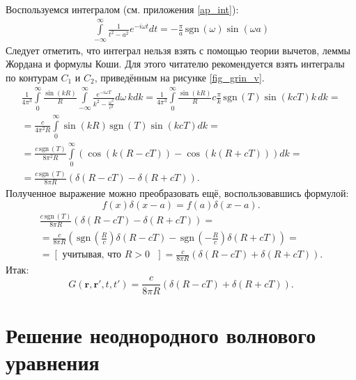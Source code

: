\documentclass[a4paper,14pt]{extreport} %
\renewcommand{\vec}[1]{\boldsymbol{#1}}
\newcommand{\sign}{\mathrm{\,sgn}\,}
\begin{document}
	Воспользуемся интегралом (см. приложения \ref{ap_int}):
	\begin{gather*}
	\int\limits_{-\infty}^\infty \frac{1}{t^2 - a^2}  e^{-i\omega t} dt = 
	-\frac{\pi}{a} \sign (\omega) \sin(\omega a)
	\end{gather*}
	Следует отметить, что интеграл нельзя взять с помощью теории вычетов, леммы Жордана и формулы Коши. Для этого читателю рекомендуется взять интегралы по контурам $C_1$ и $C_2$, приведённым на рисунке \ref{fig_grin_v}.
	\begin{equation*}
	\begin{gathered}
		\frac{1}{4\pi^3} \int\limits_0^\infty \frac{\sin (kR)}{R} \int\limits_{-\infty}^\infty  \frac{e^{-i \omega T}}{k^2 - \frac{\omega^2}{c^2}} d\omega \,k dk = 
		\frac{1}{4\pi^3} \int\limits_0^\infty \frac{\sin (kR)}{R} c \frac{\pi}{k} \sign (T) \sin (k c T) k\, dk =
		\\
		=
		\frac{c}{4\pi^2 R} \int\limits_0^\infty \sin (kR) \sign (T) \sin (kcT) dk =
		\\
		=
		\frac{c \sign (T)}{8\pi^2 R} \int\limits_0^\infty \left(\cos (k(R - cT)) - \cos(k(R+cT))\right) dk =
		\\
		=
		\frac{c \sign (T)}{8\pi R} \left( \delta(R - cT) - \delta(R + cT) \right).
	\end{gathered}
	\end{equation*}
	Полученное выражение можно преобразовать ещё, воспользовавшись формулой:
	\[
		f(x) \delta (x - a) = f(a) \delta (x- a).
	\]
	\begin{equation*}
		\begin{gathered}
			\frac{c \sign (T)}{8\pi R} \left( \delta(R - cT) - \delta(R + cT) \right) = \\ =
			\frac{c}{8\pi R} \left(\sign \left(\frac{R}{c}\right) \delta(R - cT) - \sign \left(-\frac{R}{c}\right)\delta(R + cT)\right) =
			\\
			=
			[\text{ учитывая, что $R>0$ }] = \frac{c}{8\pi R} \left(\delta(R - cT) + \delta(R + cT)\right).
		\end{gathered}
	\end{equation*}
	Итак:
	\begin{equation*}
		G(\vec{r}, \vec{r}', t, t') = \frac{c}{8\pi R} \left(\delta(R - cT) + \delta(R + cT)\right).
	\end{equation*}
	
	\section{Решение неоднородного волнового уравнения}
	
\end{document}
